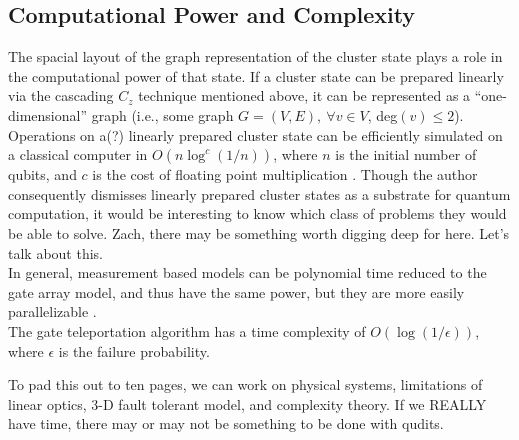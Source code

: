 \documentclass[twocolumn]{Styles/IEEEtran11}
\newcommand{\clr}{\color{myRed}}
\newcommand{\clbl}{\color{black}}
\begin{document}
\subsection{Computational Power and Complexity}
The spacial layout of the graph representation of the cluster state plays a role in the computational power of that state. If a cluster state can be prepared linearly via the cascading $C_z$ technique mentioned above, it can be represented as a  ``one-dimensional'' graph (i.e., some graph $G=(V,E),\ \forall v\in V$, deg$(v)\leq 2$). \clr Operations on a(?) \clbl linearly prepared cluster state can be efficiently simulated on a classical computer in $O(n\log ^c (1/n))$, where $n$ is the initial number of qubits, and $c$ is the cost of floating point multiplication \cite{nielsen2006cluster}. Though the author consequently dismisses linearly prepared cluster states as a substrate for quantum computation, it would be interesting to know which class of problems they would be able to solve. \clr Zach, there may be something worth digging deep for here. Let's talk about this.\clbl\\
In general, measurement based models can be polynomial time reduced to the gate array model, and thus have the same power, but they are more easily parallelizable \cite{jozsa2006introduction}.\\
The gate teleportation algorithm \cite{nielsen108020universal} has a time complexity of $O(\log (1/\epsilon))$, where $\epsilon$ is the failure probability.

\clr To pad this out to ten pages, we can work on physical systems, limitations of linear optics, 3-D fault tolerant model, and complexity theory. If we REALLY have time, there may or may not be something to be done with qudits.\clbl


\end{document}
